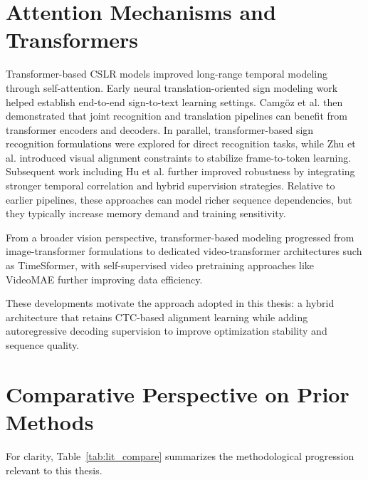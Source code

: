 \section{Attention Mechanisms and Transformers}

Transformer-based CSLR models improved long-range temporal modeling through self-attention. Early neural translation-oriented sign modeling work helped establish end-to-end sign-to-text learning settings.\cite{camgoz2018neural} Camgöz et al.\cite{camgoz2020sign} then demonstrated that joint recognition and translation pipelines can benefit from transformer encoders and decoders. In parallel, transformer-based sign recognition formulations were explored for direct recognition tasks,\cite{decoster2020transformer} while Zhu et al.\cite{zhu2021visual} introduced visual alignment constraints to stabilize frame-to-token learning. Subsequent work including Hu et al.\cite{hu2023continuous} further improved robustness by integrating stronger temporal correlation and hybrid supervision strategies. Relative to earlier pipelines, these approaches can model richer sequence dependencies, but they typically increase memory demand and training sensitivity.

From a broader vision perspective, transformer-based modeling progressed from image-transformer formulations\cite{dosovitskiy2021vit} to dedicated video-transformer architectures such as TimeSformer,\cite{bertasius2021timesformer} with self-supervised video pretraining approaches like VideoMAE further improving data efficiency.\cite{tong2022videomae}

These developments motivate the approach adopted in this thesis: a hybrid architecture that retains CTC-based alignment learning while adding autoregressive decoding supervision to improve optimization stability and sequence quality.

\section{Comparative Perspective on Prior Methods}

For clarity, Table~\ref{tab:lit_compare} summarizes the methodological progression relevant to this thesis.

